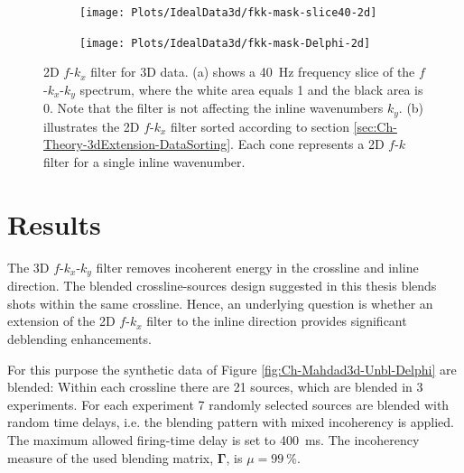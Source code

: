 \begin{figure}

	\centering 
	\begin{subfigure}[t]{0.45\textwidth}
		\centering
		\texttt{[image: Plots/IdealData3d/fkk-mask-slice40-2d]}
		\caption{}
		\label{fig:Ch-Mahdad3d-2dfk-slice}
	\end{subfigure}
	
	\par\bigskip
	
	\centering
	\begin{subfigure}[t]{\textwidth}
		\centering
		\texttt{[image: Plots/IdealData3d/fkk-mask-Delphi-2d]}
		\caption{}
		\label{fig:Ch-Mahdad3d-2dfk-Delphi}
	\end{subfigure}
	
	\caption{2D $f$-$k_x$ filter for 3D data. (a) shows a \SI{40}{\hertz} frequency slice of the $f$-$k_x$-$k_y$ spectrum, where the white area equals 1 and the black area is 0. Note that the filter is not affecting the inline wavenumbers $k_y$. (b) illustrates the 2D $f$-$k_x$ filter sorted according to section \ref{sec:Ch-Theory-3dExtension-DataSorting}. Each cone represents a 2D $f$-$k$ filter for a single inline wavenumber.}
	\label{fig:Ch-Mahdad3d-2dfk}
\end{figure}

\section{Results}

The 3D $f$-$k_x$-$k_y$ filter removes incoherent energy in the crossline and inline direction. The blended crossline-sources design suggested in this thesis blends shots within the same crossline. Hence, an underlying question is whether an extension of the 2D $f$-$k_x$ filter to the inline direction provides significant deblending enhancements.

For this purpose the synthetic data of Figure \ref{fig:Ch-Mahdad3d-Unbl-Delphi} are blended: Within each crossline there are 21 sources, which are blended in 3 experiments. For each experiment 7 randomly selected sources are blended with random time delays, i.e. the blending pattern with mixed incoherency is applied. The maximum allowed firing-time delay is set to \SI{400}{\milli\second}. The incoherency measure of the used blending matrix, $\mathbf{\Gamma}$, is $\mu = \SI{99}{\percent}$. 

